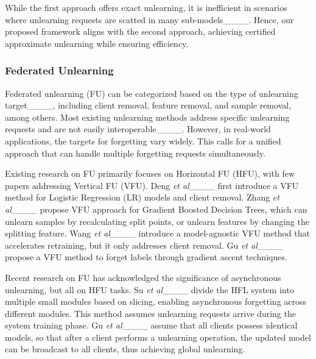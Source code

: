 While the first approach offers exact unlearning, it is inefficient in scenarios where unlearning requests are scatted in many sub-models____. %
Hence, our proposed framework aligns with the second approach, achieving certified approximate unlearning while ensuring efficiency.

\subsubsection*{Federated Unlearning}

Federated unlearning (FU) can be categorized based on the type of unlearning target____, including client removal, feature removal, and sample removal, among others. Most existing unlearning methods address specific unlearning requests and are not easily interoperable____. However, in real-world applications, the targets for forgetting vary widely. This calls for a unified approach that can handle multiple forgetting requests simultaneously.

Existing research on FU primarily focuses on Horizontal FU (HFU), with few papers addressing Vertical FU (VFU). Deng \textit{et al}____ first introduce a VFU method for Logistic Regression (LR) models and client removal. Zhang \textit{et al}____ propose VFU approach for Gradient Boosted Decision Trees, which can unlearn samples by recalculating split points, or unlearn features by changing the splitting feature. Wang \textit{et al}____ introduce a model-agnostic VFU method that accelerates retraining, but it only addresses client removal. %
Gu \textit{et al}____ propose a VFU method to forget labels through gradient ascent techniques.


Recent research on FU has acknowledged the significance of asynchronous unlearning, but all on HFU tasks. Su \textit{et al}____ divide the HFL system into multiple small modules based on slicing, enabling asynchronous forgetting across different modules. This method assumes unlearning requests arrive during the system training phase. Gu \textit{et al}____ assume that all clients possess identical models, so that after a client performs a unlearning operation, the updated model can be broadcast to all clients, thus achieving global unlearning. %

